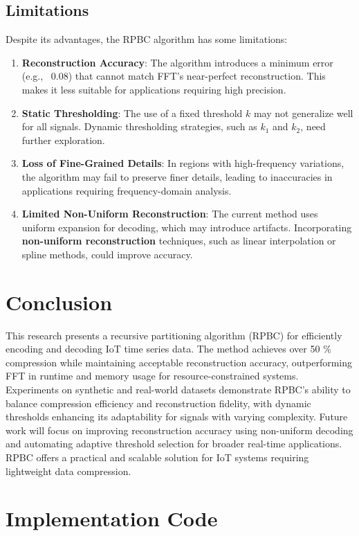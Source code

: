 \documentclass[onecolumn,conference]{IEEEtran}
\begin{document}
\subsection{Limitations}
Despite its advantages, the RPBC algorithm has some limitations:
\begin{enumerate}
    \item \textbf{Reconstruction Accuracy}: The algorithm introduces a minimum error (e.g., ~0.08) that cannot match FFT’s near-perfect reconstruction. This makes it less suitable for applications requiring high precision.
    \item \textbf{Static Thresholding}: The use of a fixed threshold \( k \) may not generalize well for all signals. Dynamic thresholding strategies, such as \( k_1 \) and \( k_2 \), need further exploration.
    \item \textbf{Loss of Fine-Grained Details}: In regions with high-frequency variations, the algorithm may fail to preserve finer details, leading to inaccuracies in applications requiring frequency-domain analysis.
    \item \textbf{Limited Non-Uniform Reconstruction}: The current method uses uniform expansion for decoding, which may introduce artifacts. Incorporating \textbf{non-uniform reconstruction} techniques, such as linear interpolation or spline methods, could improve accuracy.
\end{enumerate}


\section{Conclusion}
This research presents a recursive partitioning algorithm (RPBC) for efficiently encoding and decoding IoT time series data. The method achieves over 50 \% compression while maintaining acceptable reconstruction accuracy, outperforming FFT in runtime and memory usage for resource-constrained systems.
Experiments on synthetic and real-world datasets demonstrate RPBC’s ability to balance compression efficiency and reconstruction fidelity, with dynamic thresholds enhancing its adaptability for signals with varying complexity. Future work will focus on improving reconstruction accuracy using non-uniform decoding and automating adaptive threshold selection for broader real-time applications. RPBC offers a practical and scalable solution for IoT systems requiring lightweight data compression.


\newpage
\appendix
\section{Implementation Code}
\end{document}
